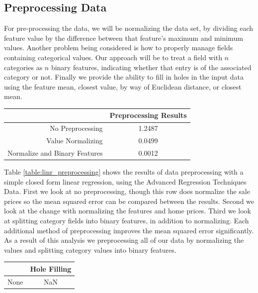 \documentclass[10pt]{article}
\begin{document}
\begin{multicols}{2}
		\section{Preprocessing Data}
		For pre-processing the data, we will be normalizing the data set, by dividing each feature value by the difference between that feature's maximum and minimum values. Another problem being considered is how to properly manage fields containing categorical values. Our approach will be to treat a field with \(n\) categories as \(n\) binary features, indicating whether that entry is of the associated category or not. Finally we provide the ability to fill in holes in the input data using the feature mean, closest value, by way of Euclidean distance, or closest mean.
                \par
		{\centering
        	\captionsetup{type=table}
			\begin{tabular}{r|c}
				& \small{Preprocessing Results} \\
				\hline
				\small{No Preprocessing} & \small{1.2487} \\
				\hline
				\small{Value Normalizing} & \small{0.0499} \\
				\hline
				\small{Normalize and Binary Features} & \small{0.0012} \\
				\hline
			\end{tabular}
			\label{table:linr_preprocessing}
		\setlength{\parindent}{15pt} }
                \par
                Table \ref{table:linr_preprocessing} shows the results of data preprocessing with a simple closed form linear regression, using the Advanced Regression Techniques Data. First we look at no preprocessing, though this row does normalize the sale prices so the mean squared error can be compared between the results. Second we look at the change with normalizing the features and home prices. Third we look at splitting category fields into binary features, in addition to normalizing. Each additional method of preprocessing improves the mean squared error significantly. As a result of this analysis we preprocessing all of our data by normalizing the values and splitting category values into binary features.
                \par
		{\centering
        	\captionsetup{type=table}
			\begin{tabular}{r|c}
				& \small{Hole Filling} \\
				\hline
				\small{None} & \small{NaN} \\

\end{tabular}}
\end{multicols}
\end{document}
